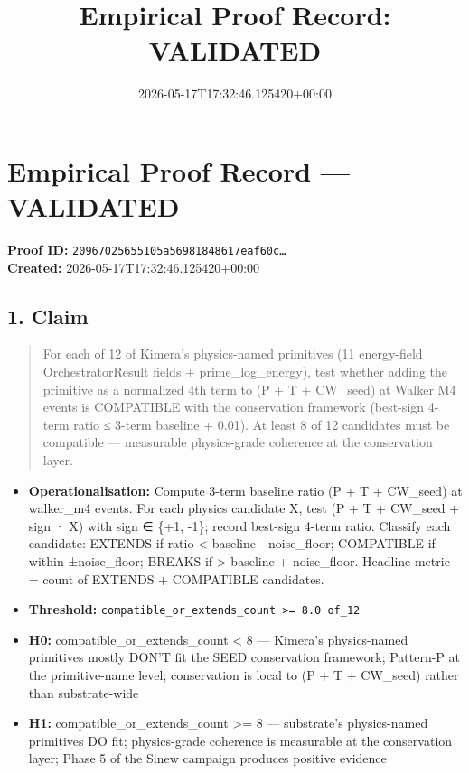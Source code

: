 \documentclass{article}
\title{Empirical Proof Record: VALIDATED}
\date{2026-05-17T17:32:46.125420+00:00}
\begin{document}
\maketitle
\section*{Empirical Proof Record --- \textcolor{validated}{\textbf{VALIDATED}}}
\textbf{Proof ID:} \texttt{20967025655105a56981848617eaf60c\dots}\\
\textbf{Created:} 2026-05-17T17:32:46.125420+00:00
\subsection*{1. Claim}
\begin{quote}For each of 12 of Kimera's physics-named primitives (11 energy-field OrchestratorResult fields + prime\_log\_energy), test whether adding the primitive as a normalized 4th term to (P + T + CW\_seed) at Walker M4 events is COMPATIBLE with the conservation framework (best-sign 4-term ratio ≤ 3-term baseline + 0.01). At least 8 of 12 candidates must be compatible — measurable physics-grade coherence at the conservation layer.\end{quote}
\begin{itemize}
\item \textbf{Operationalisation:} Compute 3-term baseline ratio (P + T + CW\_seed) at walker\_m4 events. For each physics candidate X, test (P + T + CW\_seed + sign · X) with sign ∈ \{+1, -1\}; record best-sign 4-term ratio. Classify each candidate: EXTENDS if ratio < baseline - noise\_floor; COMPATIBLE if within ±noise\_floor; BREAKS if > baseline + noise\_floor. Headline metric = count of EXTENDS + COMPATIBLE candidates.
\item \textbf{Threshold:} \texttt{compatible\_or\_extends\_count >= 8.0 of\_12}
\item \textbf{H0:} compatible\_or\_extends\_count < 8 — Kimera's physics-named primitives mostly DON'T fit the SEED conservation framework; Pattern-P at the primitive-name level; conservation is local to (P + T + CW\_seed) rather than substrate-wide
\item \textbf{H1:} compatible\_or\_extends\_count >= 8 — substrate's physics-named primitives DO fit; physics-grade coherence is measurable at the conservation layer; Phase 5 of the Sinew campaign produces positive evidence
\end{itemize}
\end{document}
